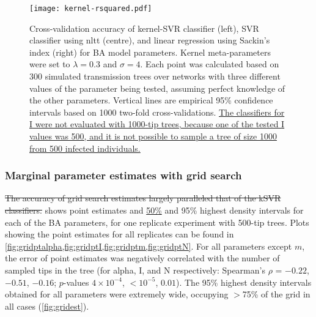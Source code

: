 \begin{figure}[ht]
  \centering
  \texttt{[image: kernel-rsquared.pdf]}
  \caption[Cross-validation accuracy of kernel-SVR, nLTT-based SVR, and
  Sackin's index regression classifiers for BA model parameters.]{
      Cross-validation accuracy of kernel-SVR classifier (left), SVR classifier
      using \gls{nltt} (centre), and linear regression using Sackin's index
      (right) for \gls{BA} model parameters. Kernel meta-parameters were set to
      $\lambda = 0.3$ and $\sigma = 4$. Each point was calculated based on 300
      simulated transmission trees over networks with three different values of
      the parameter being tested, assuming perfect knowledge of the other
      parameters. Vertical lines are empirical 95\% confidence intervals based
      on 1000 two-fold cross-validations. {\color{blue}\uline{ The classifiers
      for \gls{I} were not evaluated with 1000-tip trees, because one of the
      tested \gls{I} values was 500, and it is not possible to sample a tree of
      size 1000 from 500 infected individuals.}}
  }
  \label{fig:rsquared}
\end{figure}

\subsubsection*{Marginal parameter estimates with grid search}



{\color{red}\sout{The accuracy of grid search estimates largely paralleled that
of the \gls{kSVR} classifiers.}} shows point estimates and
{\color{blue}\uline{50\%}} and 95\% highest density intervals for each of the
\gls{BA} parameters, for one replicate experiment with 500-tip trees. Plots
showing the point estimates for all replicates can be found in
\cref{fig:gridptalpha,fig:gridptI,fig:gridptm,fig:gridptN}. For all parameters
except $m$, the error of point estimates was negatively correlated with the
number of sampled tips in the tree (for \gls{alpha}, \gls{I}, and \gls{N}
respectively: Spearman's $\rho$ = \ensuremath{-0.22},
\ensuremath{-0.51}, \ensuremath{-0.16}; $p$-values
    $4\!\times\!10^{-4}$,
    ${<}10^{-5}$,
    $0.01$).
The 95\% highest density intervals obtained for all parameters were extremely
wide, occupying $>$75\% of the grid in all cases (\cref{fig:gridest}).

